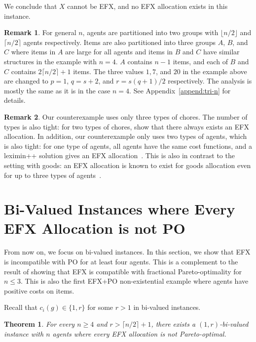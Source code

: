 \documentclass{article}
\newtheorem{theorem}{Theorem}
\theoremstyle{definition}
\newtheorem{remark}{Remark}
\begin{document}
We conclude that $X$ cannot be EFX, and no EFX allocation exists in this instance.

\begin{remark}
    For general $n$, agents are partitioned into two groups with $\lfloor n/2\rfloor$ and $\lceil n/2\rceil$ agents respectively. Items are also partitioned into three groups $A$, $B$, and $C$ where items in $A$ are large for all agents and items in $B$ and $C$ have similar structures in the example with $n=4$.
    $A$ contains $n-1$ items, and each of $B$ and $C$ contains $2\lceil n/2\rceil+1$ items.
    The three values $1,7$, and $20$ in the example above are changed to $p=1$, $q=s+2$, and $r=s(q+1)/2$ respectively.
    The analysis is mostly the same as it is in the case $n=4$.
    See Appendix~\ref{append:tri-n} for details.
\end{remark}

\begin{remark}
    Our counterexample uses only three types of chores. The number of types is also tight: for two types of chores, \citet{aziz2023fair} show that there always exists an EFX allocation. In addition, our counterexample only uses two types of agents, which is also tight: for one type of agents, all agents have the same cost functions, and a leximin++ solution gives an EFX allocation~\citep{plaut2020almost,chen2020fairness}.
    This is also in contrast to the setting with goods: an EFX allocation is known to exist for goods allocation even for up to three types of agents~\citep{hv2025efx}.
\end{remark}

\section{Bi-Valued Instances where Every EFX Allocation is not PO}
From now on, we focus on bi-valued instances.
In this section, we show that EFX is incompatible with PO for at least four agents.
This is a complement to the result of \citet{garg2023new} showing that EFX is compatible with fractional Pareto-optimality for $n\leq 3$.
This is also the first EFX+PO non-existential example where agents have positive costs on items.

Recall that $c_i(g)\in\{1,r\}$ for some $r>1$ in bi-valued instances.

\begin{theorem}\label{thm:EFXPO}
    For every $n\geq 4$ and $r>\lceil n/2\rceil+1$, there exists a $(1,r)$-bi-valued instance with $n$ agents where every EFX allocation is not Pareto-optimal.
\end{theorem}
\end{document}
